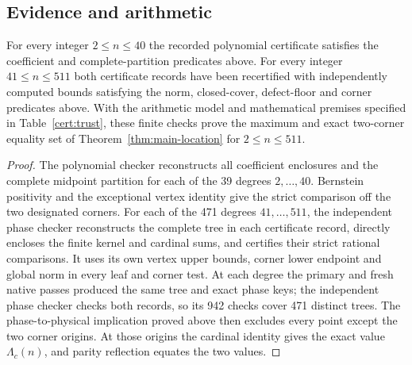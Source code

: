 \subsection{Evidence and arithmetic}
\begin{proposition}\label{cert:finite-verification}
For every integer $2\leq n\leq40$ the recorded polynomial certificate
satisfies the coefficient and complete-partition predicates above.
For every integer $41\leq n\leq511$ both certificate records have been
recertified with independently computed bounds satisfying the norm,
closed-cover, defect-floor and corner predicates above.
With the arithmetic model and mathematical premises specified in
Table~\ref{cert:trust}, these finite checks prove the maximum and exact
two-corner equality set of Theorem~\ref{thm:main-location} for
$2\leq n\leq511$.
\end{proposition}
\begin{proof}
The polynomial checker reconstructs all coefficient enclosures and the
complete midpoint partition for each of the 39 degrees $2,\ldots,40$.
Bernstein positivity and the exceptional vertex identity give the strict
comparison off the two designated corners.
For each of the 471 degrees $41,\ldots,511$, the independent phase checker
reconstructs the complete tree in each certificate record, directly encloses the finite kernel and
cardinal sums, and certifies their strict rational comparisons. It uses
its own vertex upper bounds, corner lower endpoint and global norm in
every leaf and corner test. At each degree the primary and fresh
native passes produced the same tree and exact phase keys; the independent phase checker checks
both records, so its 942 checks cover 471 distinct trees.
The phase-to-physical implication proved above then excludes every point
except the two corner origins. At those origins the cardinal identity
gives the exact value $\Lambda_c(n)$, and parity reflection equates the
two values.
\end{proof}

